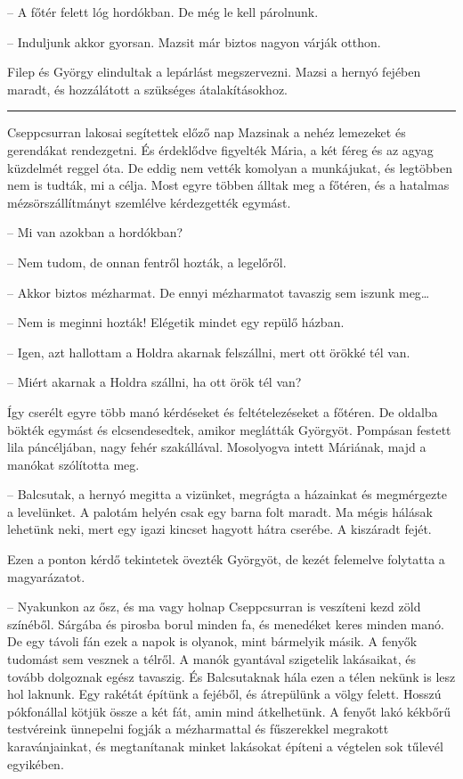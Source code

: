 \documentclass[10pt]{memoir}
\renewcommand{\pfbreakdisplay}{\bigskip \ding{166} \bigskip}
\newcommand{\secbreak}{\fancybreak{\pfbreakdisplay}\indent}
\begin{document}
-- A főtér felett lóg hordókban. De még le kell párolnunk.

-- Induljunk akkor gyorsan. Mazsit már biztos nagyon várják otthon.

Filep és György elindultak a lepárlást megszervezni. Mazsi a hernyó fejében
maradt, és hozzálátott a szükséges átalakításokhoz.

\secbreak

Cseppcsurran lakosai segítettek előző nap Mazsinak a nehéz lemezeket és
gerendákat rendezgetni. És érdeklődve figyelték Mária, a két féreg és az agyag
küzdelmét reggel óta. De eddig nem vették komolyan a munkájukat, és legtöbben
nem is tudták, mi a célja. Most egyre többen álltak meg a főtéren, és a
hatalmas mézsörszállítmányt szemlélve kérdezgették egymást.

-- Mi van azokban a hordókban?

-- Nem tudom, de onnan fentről hozták, a legelőről.

-- Akkor biztos mézharmat. De ennyi mézharmatot tavaszig sem iszunk meg\dots

-- Nem is meginni hozták! Elégetik mindet egy repülő házban.

-- Igen, azt hallottam a Holdra akarnak felszállni, mert ott örökké tél van.

-- Miért akarnak a Holdra szállni, ha ott örök tél van?

Így cserélt egyre több manó kérdéseket és feltételezéseket a főtéren. De
oldalba bökték egymást és elcsendesedtek, amikor meglátták Györgyöt. Pompásan
festett lila páncéljában, nagy fehér szakállával. Mosolyogva intett Máriának,
majd a manókat szólította meg.

-- Balcsutak, a hernyó megitta a vizünket, megrágta a házainkat és megmérgezte
a levelünket. A palotám helyén csak egy barna folt maradt. Ma mégis hálásak
lehetünk neki, mert egy igazi kincset hagyott hátra cserébe. A kiszáradt fejét.

Ezen a ponton kérdő tekintetek övezték Györgyöt, de kezét felemelve folytatta a
magyarázatot.

-- Nyakunkon az ősz, és ma vagy holnap Cseppcsurran is veszíteni kezd zöld
színéből. Sárgába és pirosba borul minden fa, és menedéket keres minden manó.
De egy távoli fán ezek a napok is olyanok, mint bármelyik másik. A fenyők
tudomást sem vesznek a télről. A manók gyantával szigetelik lakásaikat, és
tovább dolgoznak egész tavaszig. És Balcsutaknak hála ezen a télen nekünk is
lesz hol laknunk. Egy rakétát építünk a fejéből, és átrepülünk a völgy felett.
Hosszú pókfonállal kötjük össze a két fát, amin mind átkelhetünk. A fenyőt lakó
kékbőrű testvéreink ünnepelni fogják a mézharmattal és fűszerekkel megrakott
karavánjainkat, és megtanítanak minket lakásokat építeni a végtelen sok tűlevél
egyikében.
\end{document}
